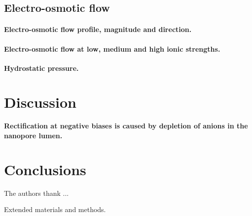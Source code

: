 \documentclass[journal=ancac3, manuscript=article, etalmode=truncate,maxauthors=0]{achemso}
\begin{document}
\subsection{Electro-osmotic flow}


\paragraph{Electro-osmotic flow profile, magnitude and direction.}
\paragraph{Electro-osmotic flow at low, medium and high ionic strengths.}
\paragraph{Hydrostatic pressure.}



\section{Discussion}

\paragraph{Rectification at negative biases is caused by depletion of anions in the nanopore lumen.}

\section{Conclusions}

\begin{acknowledgement}
The authors thank ...
\end{acknowledgement}


\begin{suppinfo}
	Extended materials and methods.
\end{suppinfo}








\newpage %


%
\end{document}

